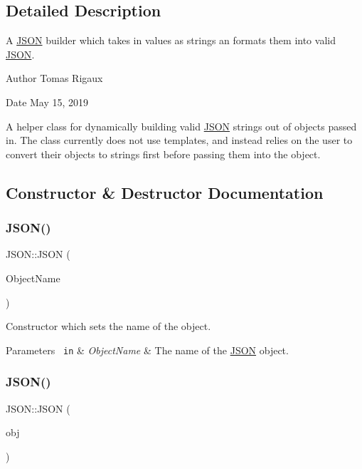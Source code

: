 \subsection{Detailed Description}
A \mbox{\hyperlink{class_j_s_o_n}{J\+S\+ON}} builder which takes in values as strings an formats them into valid \mbox{\hyperlink{class_j_s_o_n}{J\+S\+ON}}. 

\begin{DoxyAuthor}{Author}
Tomas Rigaux 
\end{DoxyAuthor}
\begin{DoxyDate}{Date}
May 15, 2019
\end{DoxyDate}
A helper class for dynamically building valid \mbox{\hyperlink{class_j_s_o_n}{J\+S\+ON}} strings out of objects passed in. The class currently does not use templates, and instead relies on the user to convert their objects to strings first before passing them into the object. 

\subsection{Constructor \& Destructor Documentation}
\mbox{\label{class_j_s_o_n_a6ec05bd5385055e466d43c01b4a38e8a}} 
\subsubsection{\texorpdfstring{JSON()}{JSON()}\hspace{0.1cm}{\footnotesize\ttfamily [1/4]}}
{\footnotesize\ttfamily J\+S\+O\+N\+::\+J\+S\+ON (\begin{DoxyParamCaption}\item[{std\+::string}]{Object\+Name }\end{DoxyParamCaption})}

Constructor which sets the name of the object. 
\begin{DoxyParams}[1]{Parameters}
\mbox{\texttt{ in}}  & {\em Object\+Name} & The name of the \mbox{\hyperlink{class_j_s_o_n}{J\+S\+ON}} object. \\
\hline
\end{DoxyParams}
\mbox{\label{class_j_s_o_n_a739debfabd82d78609f6fa8bf840ff70}} 
\subsubsection{\texorpdfstring{JSON()}{JSON()}\hspace{0.1cm}{\footnotesize\ttfamily [2/4]}}
{\footnotesize\ttfamily J\+S\+O\+N\+::\+J\+S\+ON (\begin{DoxyParamCaption}\item[{const \mbox{\hyperlink{class_j_s_o_n}{J\+S\+ON}} \&}]{obj }\end{DoxyParamCaption})}


